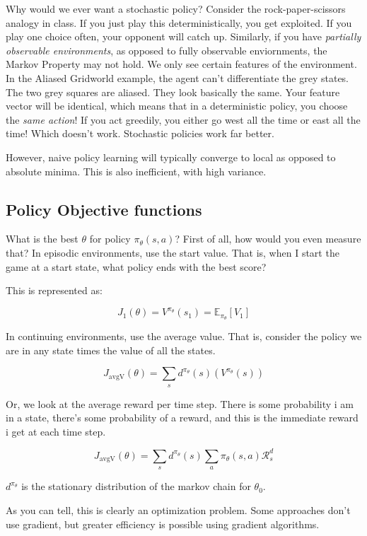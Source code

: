 \documentclass[10pt, oneside]{article}
\theoremstyle{definition}
\begin{document}
Why would we ever want a stochastic policy? Consider the rock-paper-scissors analogy in class. If you just play this deterministically, you get exploited. If you play one choice often, your opponent will catch up. Similarly, if you have \textit{partially observable environments}, as opposed to fully observable enviornments, the Markov Property may not hold. We only see certain features of the environment. In the Aliased Gridworld example, the agent can't differentiate the grey states. The two grey squares are aliased. They look basically the same. Your feature vector will be identical, which means that in a deterministic policy, you choose the \textit{same action}! If you act greedily, you either go west all the time or east all the time! Which doesn't work. 
Stochastic policies work far better. 

However, naive policy learning will typically converge to local as opposed to absolute minima. This is also inefficient, with high variance. 

\subsection{Policy Objective functions}
What is the best $\theta$ for policy $\pi_\theta(s,a)$? First of all, how would you even measure that?
In episodic environments, use the start value. 
That is, when I start the game at a start state, what policy ends with the best score?

This is represented as:

\[J_1(\theta) = V^{\pi_\theta}(s_1) = \mathbb{E}_{\pi_\theta}[V_1]   \]

In continuing environments, use the average value. 
That is, consider the policy we are in any state times the value of all the states.

\[J_{\text{avgV}}(\theta) = \sum_s{d^{\pi_\theta}(s)(V^{\pi_\theta}(s)) }  \]


Or, we look at the average reward per time step. There is some probability i am in a state, there's some probability of a reward, and this is the immediate reward i get at each time step. 

\[J_{\text{avgV}}(\theta) = \sum_s{d^{\pi_\theta}(s)\sum_a{\pi_\theta}(s,a)\mathcal{R}_s^d }  \]

$d^{\pi_\theta}$ is the stationary distribution of the markov chain for $\theta_0$.

As you can tell, this is clearly an optimization problem. Some approaches don't use gradient, but greater efficiency is possible using gradient algorithms. 
\end{document}
